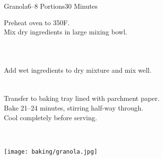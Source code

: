 \begin{recipe}{Granola}{6--8 Portions}{30 Minutes}

Preheat oven to 350\degrees F.\\

Mix dry ingredients in large mixing bowl.\\~\\~\\~\\

Add wet ingredients to dry mixture and mix well.\\~\\~\\

\newstep
Transfer to baking tray lined with parchment paper.\\

\newstep
Bake 21--24 minutes, stirring half-way through.\\

\newstep
Cool completely before serving.

\end{recipe}

\begin{center}
~\\~\\
\texttt{[image: baking/granola.jpg]}
\end{center}